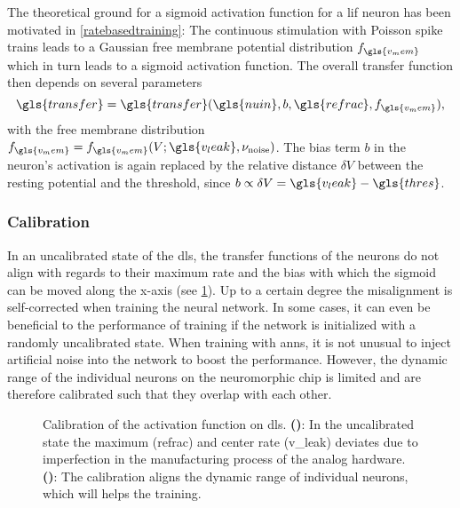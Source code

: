 The theoretical ground for a sigmoid activation function for a \gls{lif} neuron has been motivated in \cref{ratebasedtraining}: The continuous stimulation with Poisson spike trains leads to a Gaussian free membrane potential distribution $f_{\gls{v_mem}}$ which in turn leads to a sigmoid activation function. The overall transfer function then depends on several parameters
\begin{equation}
\gls{transfer} = \gls{transfer}(\gls{nuin}, b, \gls{refrac}, f_{\gls{v_mem}}),
\end{equation}
with the free membrane distribution $f_{\gls{v_mem}} = f_{\gls{v_mem}}(V; \gls{v_leak}, \nu_\text{noise})$. 
The bias term $b$ in the neuron's activation is again replaced by the relative distance $\delta V$ between the resting potential and the threshold, since $b \propto \delta V = \gls{v_leak} - \gls{thres}$. 

\subsubsection*{Calibration}\label{calibration}
In an uncalibrated state of the \gls{dls}, the transfer functions of the neurons do not align with regards to their maximum rate and the bias with which the sigmoid can be moved along the x-axis (see \cref{transferfunction_wout_calib}). Up to a certain degree the misalignment is self-corrected when training the neural network. In some cases, it can even be beneficial to the performance of training if the network is initialized with a randomly uncalibrated state. When training with \glspl{ann}, it is not unusual to inject artificial noise into the network to boost the performance. However, the dynamic range of the individual neurons on the neuromorphic chip is limited and are therefore calibrated such that they overlap with each other.

\begin{figure}
	\centering
	\begin{subfigure}[b]{0.49\textwidth}
		\caption{}
		
		\label{transferfunction_wout_calib}
	\end{subfigure}
	\begin{subfigure}[b]{0.49\textwidth}		
		\caption{}
		
		\label{transferfunction_w_calib}
	\end{subfigure}
	\caption[Calibration of the sigmoid activation function on \acrshort{dls}.]{Calibration of the activation function on \acrshort{dls}. \textbf{()}: In the uncalibrated state the maximum (\gls{refrac}) and center rate (\gls{v_leak}) deviates due to imperfection in the manufacturing process of the analog hardware.  \textbf{()}: The calibration aligns the dynamic range of individual neurons, which will helps the training.}
\end{figure}

